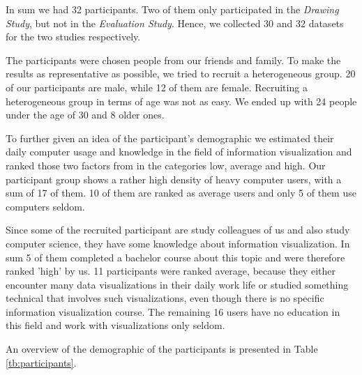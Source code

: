 In sum we had 32 participants. Two of them only participated in the \textit{Drawing Study}, but not in the \textit{Evaluation Study}. Hence, we collected 30 and 32 datasets for the two studies respectively. \par \medskip

The participants were chosen people from our friends and family. To make the results as representative as possible, we tried to recruit a heterogeneous group. 20 of our participants are male, while 12 of them are female. Recruiting a heterogeneous group in terms of age was not as easy. We ended up with 24 people under the age of 30 and 8 older ones. \par \medskip

To further given an idea of the participant's demographic we estimated their daily computer usage and knowledge in the field of information visualization and ranked those two factors from in the categories low, average and high. Our participant group shows a rather high density of heavy computer users, with a sum of 17 of them. 10 of them are ranked as average users and only 5 of them use computers seldom. \par \medskip

Since some of the recruited participant are study colleagues of us and also study computer science, they have some knowledge about information visualization. In sum 5 of them completed a bachelor course about this topic and were therefore ranked 'high' by us. 11 participants were ranked average, because they either encounter many data visualizations in their daily work life or studied something technical that involves such visualizations, even though there is no specific information visualization course. The remaining 16 users have no education in this field and work with visualizations only seldom. \par \medskip

An overview of the demographic of the participants is presented in Table \ref{tb:participants}.


